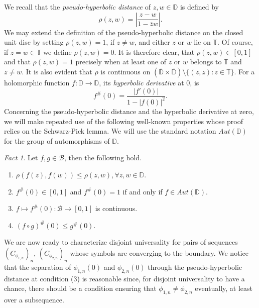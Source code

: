 \documentclass[12pt,a4paper]{amsart}
\theoremstyle{plain}
\theoremstyle{definition}
\theoremstyle{remark}
\theoremstyle{fact}
\newtheorem{fact}[theorem]{Fact}
\begin{document}
    We recall that  the \textit{pseudo-hyperbolic distance} of $z,w \in \mathbb{D}$ is defined by 
        $$
        \rho(z,w)=\left|\frac{z-w}{1-\overline{z}w}\right|.
        $$
    We may extend the definition of the pseudo-hyperbolic distance on the closed unit disc by setting $\rho(z,w)=1$, if $z\neq w$, and either $z$ or $w$ lie on $\mathbb{T}$. Of course, if $z=w\in \mathbb{T}$ we define $\rho(z,w)=0$. It is therefore clear, that $\rho(z,w)\in [0,1]$ and that $\rho(z,w)=1$ precisely when at least one of $z$ or $w$ belongs to $\mathbb{T}$ and $z\neq w$. It is also evident that $\rho$ is continuous on $(\overline{\mathbb{D}}\times \overline{\mathbb{D}})\setminus \{(z,z): z\in \mathbb{T}\}$. For a holomorphic function $f:\mathbb{D}\rightarrow \mathbb{D}$, its {\it hyperbolic derivative} at $0$, is 
    $$
    f^\#(0)=\frac{|f'(0)|}{1-|f(0)|^2}.
    $$
    Concerning the pseudo-hyperbolic distance and the hyperbolic derivative at zero, we will make repeated use of the following well-known properties whose proof relies on the Schwarz-Pick lemma. We will use the standard notation $Aut(\mathbb{D})$ for the group of automorphisms of $\mathbb{D}$.
    \begin{fact}\label{fact}
        Let $f,g\in \mathcal{B}$, then the following hold.
        \begin{enumerate}
            \item $\rho(f(z),f(w))\leq \rho(z,w), \forall z,w\in \mathbb{D}$.
            \item $f^\#(0)\in [0,1]$ and $f^\#(0)=1$ if and only if $f\in Aut(\mathbb{D})$.
            \item $f\mapsto f^\#(0):\mathcal{B}\rightarrow [0,1]$ is continuous.
            \item $(f\circ g)^\#(0)\leq g^\#(0)$.
        \end{enumerate}
    \end{fact}

    We are now ready to characterize disjoint universality for pairs of sequences $(C_{\phi_{1, n}})_n$, $(C_{\phi_{2, n}})_n$ whose symbols are converging to the boundary. We notice that the separation of $\phi_{1, n}(0)$ and $\phi_{2, n}(0)$ through the pseudo-hyperbolic distance at condition (3) is reasonable since, for disjoint universality to have a chance, there should be a condition ensuring that  $\phi_{1, n}\neq \phi_{2, n}$ eventually, at least over a subsequence.
    
\end{document}

